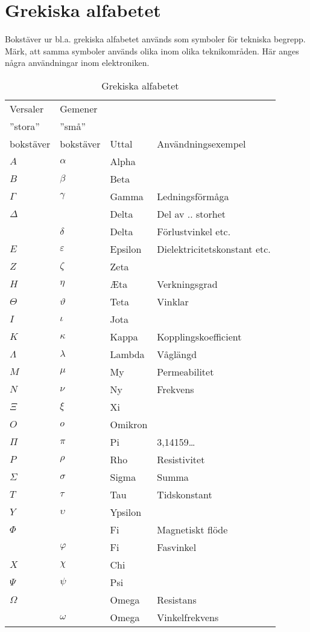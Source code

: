 \section{Grekiska alfabetet}

\begin{table}
  \caption{Grekiska alfabetet}

  Bokstäver ur bl.a. grekiska alfabetet används som symboler för
  tekniska begrepp. Märk, att samma symboler används olika inom olika
  teknikområden. Här anges några användningar inom elektroniken.

  \begin{tabular}{ll|l|l}
    Versaler  & Gemener   &       & \\
    ''stora'' & ''små''   &       & \\
    bokstäver & bokstäver & Uttal & Användningsexempel \\
    \hline
    \(A\) & \(\alpha\) & Alpha & \\
    \(B\) & \(\beta\) & Beta & \\
    \(\Gamma\) & \(\gamma\) & Gamma & Ledningsförmåga \\
    \(\Delta\) & & Delta & Del av .. storhet \\
    & \(\delta\) & Delta & Förlustvinkel etc. \\
    \(E\) & \(\varepsilon\) & Epsilon & Dielektricitetskonstant etc.\\
    \(Z\) & \(\zeta\) & Zeta & \\
    \(H\) & \(\eta\) & \AE ta & Verkningsgrad\\
    \(\Theta\) & \(\vartheta\) & Teta & Vinklar \\
    \(I\) & \(\iota\) & Jota & \\
    \(K\) & \(\kappa\) & Kappa & Kopplingskoefficient \\
    \(\Lambda\) & \(\lambda\) & Lambda & Våglängd \\
    \(M\) & \(\mu\) & My & Permeabilitet \\
    \(N\) & \(\nu\) & Ny & Frekvens \\
    \(\Xi\) & \(\xi\) & Xi & \\
    \(O\) & \(o\) & Omikron & \\
    \(\Pi\) & \(\pi\) & Pi & 3,14159\dots \\
    \(P\) & \(\rho\) & Rho & Resistivitet \\
    \(\Sigma\) & \(\sigma\) & Sigma & Summa \\
    \(T\) & \(\tau\) & Tau & Tidskonstant \\
    \(Y\) & \(\upsilon\) & Ypsilon &  \\
    \(\Phi\) & & Fi & Magnetiskt flöde \\
    & \(\varphi\) & Fi & Fasvinkel \\
    \(X\) & \(\chi\) & Chi & \\
    \(\Psi\) & \(\psi\) & Psi & \\
    \(\Omega\) & & Omega & Resistans \\
    & \(\omega\) & Omega & Vinkelfrekvens \\
  \end{tabular}
\end{table}
